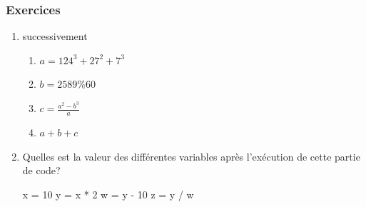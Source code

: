 \subsubsection{Exercices}

\begin{enumerate}
    \item successivement 
    \begin{enumerate}
    	\item $a = 124^3 + 27^2 + 7^3$
    	\item $b = 2589 \% 60$
    	\item $c =\frac{a^2 - b^3}{a}$
    	\item $a+b+c$
    \end{enumerate}

    \item Quelles est la valeur des différentes variables après l'exécution de
        cette partie de code?

\begin{python}
x = 10
y = x * 2
w = y - 10
z = y / w
\end{python}
\end{enumerate}